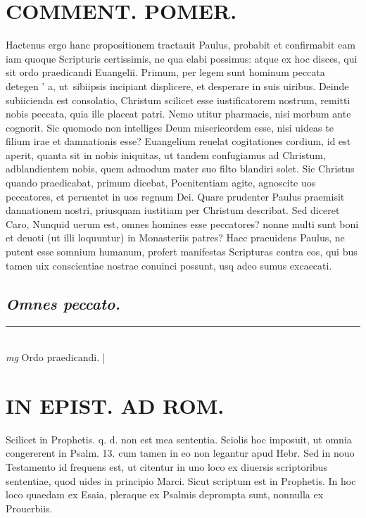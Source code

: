 \documentclass{article}
\begin{document}
\begin{pages}
\section*{COMMENT. POMER.  }\pstart Hactenus ergo hanc propositionem tractauit Paulus, probabit et confirmabit eam iam quoque Scripturis certissimis, ne qua elabi possimus: atque ex hoc disces, qui sit ordo praedicandi Euangelii. Primum, per legem sunt hominum peccata detegen ' a, ut sibiipsis incipiant displicere, et desperare in suis uiribus. Deinde subiicienda est consolatio, Christum scilicet esse iustificatorem nostrum, remitti nobis peccata, quia ille placeat patri. Nemo utitur pharmacis, nisi morbum ante cognorit. Sic quomodo non intelliges Deum misericordem esse, nisi uideas te filium irae et damnationis esse? Euangelium reuelat cogitationes cordium, id est aperit, quanta sit in nobis iniquitas, ut tandem confugiamus ad Christum, adblandientem nobis, quem admodum mater suo filto blandiri solet. Sic Christus quando praedicabat, primum dicebat, Poenitentiam agite, agnoscite uos peccatores, et peruentet in uos regnum Dei. Quare prudenter Paulus praemisit dannationem nostri, priusquam iustitiam per Christum describat. Sed diceret Caro, Nunquid uerum est, omnes homines esse peccatores? nonne multi sunt boni et deuoti (ut illi loquuntur) in Monasteriis patres? Haec praeuidens Paulus, ne putent esse somnium humanum, profert manifestas Scripturas contra eos, qui bus tamen uix conscientiae nostrae conuinci possunt, usq adeo sumus excaecati.   \pend
{}
{}
\subsection*{\textit{Omnes peccato. }}\pstart  \pend
\vspace{0.5cm}\noindent
\vspace{0.2cm}\rule{1cm}{0.2pt}\\ 
\hspace{0.2cm}\textit{mg}
\footnotesize Ordo praedicandi.  
\normalsize| 
\section*{IN EPIST. AD ROM.  }
\marginpar{[ p.19 ]}\pstart Scilicet in Prophetis. q. d. non est mea sententia.  Sciolis hoc imposuit, ut omnia congererent in Psalm.  13. cum tamen in eo non legantur apud Hebr. Sed in nouo Testamento id frequens est, ut citentur in uno loco ex diuersis scriptoribus sententiae, quod uides in principio Marci. Sicut scriptum est in Prophetis. In hoc loco quaedam ex Esaia, pleraque ex Psalmis deprompta sunt, nonnulla ex Prouerbiis.   \pend
{}
{}

\end{pages}
\end{document}
